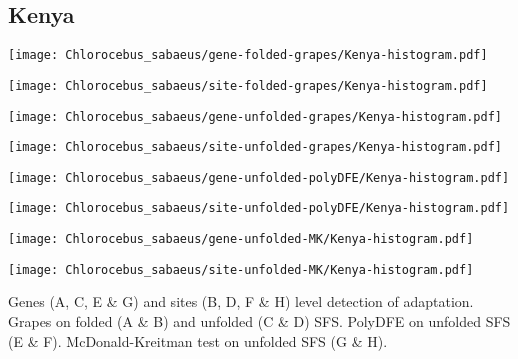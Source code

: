\documentclass{article}
\begin{document}
\pagebreak
\subsection{Kenya}
\centering
\begin{minipage}{0.49\linewidth}
    \texttt{[image: Chlorocebus\_sabaeus/gene-folded-grapes/Kenya-histogram.pdf]}
\end{minipage}%
\hfill
\begin{minipage}{0.49\linewidth}
    \texttt{[image: Chlorocebus\_sabaeus/site-folded-grapes/Kenya-histogram.pdf]}
\end{minipage}
\hfill
\begin{minipage}{0.49\linewidth}
    \texttt{[image: Chlorocebus\_sabaeus/gene-unfolded-grapes/Kenya-histogram.pdf]}
\end{minipage}%
\hfill
\begin{minipage}{0.49\linewidth}
    \texttt{[image: Chlorocebus\_sabaeus/site-unfolded-grapes/Kenya-histogram.pdf]}
\end{minipage}
\hfill
\begin{minipage}{0.49\linewidth}
    \texttt{[image: Chlorocebus\_sabaeus/gene-unfolded-polyDFE/Kenya-histogram.pdf]}
\end{minipage}%
\hfill
\begin{minipage}{0.49\linewidth}
    \texttt{[image: Chlorocebus\_sabaeus/site-unfolded-polyDFE/Kenya-histogram.pdf]}
\end{minipage}
\hfill
\begin{minipage}{0.49\linewidth}
    \texttt{[image: Chlorocebus\_sabaeus/gene-unfolded-MK/Kenya-histogram.pdf]}
\end{minipage}%
\hfill
\begin{minipage}{0.49\linewidth}
    \texttt{[image: Chlorocebus\_sabaeus/site-unfolded-MK/Kenya-histogram.pdf]}
\end{minipage}
\hfill
\flushleft
Genes (A, C, E \& G) and sites (B, D, F \& H) level detection of adaptation.
Grapes on folded (A \& B) and unfolded (C \& D) SFS.
PolyDFE on unfolded SFS (E \& F).
McDonald-Kreitman test on unfolded SFS (G \& H).
\end{document}
